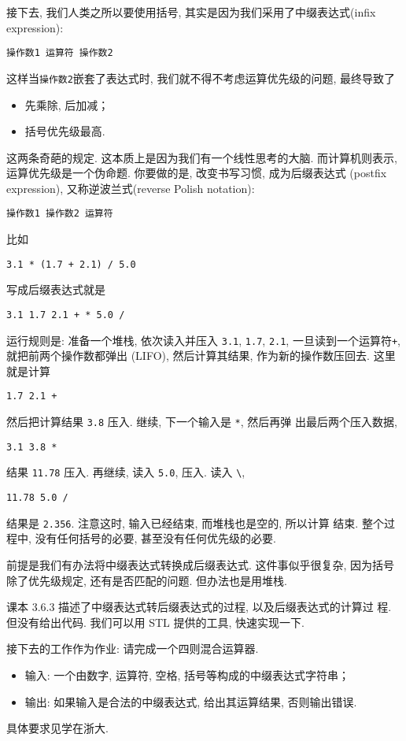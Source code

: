 \documentclass[a4paper]{ctexart}
\theoremstyle{definition}
\theoremstyle{definition}
\begin{document}
接下去, 我们人类之所以要使用括号, 其实是因为我们采用了中缀表达式(inﬁx
expression):
\begin{verbatim}
操作数1 运算符 操作数2 
\end{verbatim}
这样当\verb|操作数2|嵌套了表达式时, 我们就不得不考虑运算优先级的问题,
最终导致了
\begin{itemize}
\item 先乘除, 后加减；
\item 括号优先级最高.
\end{itemize}
这两条奇葩的规定. 这本质上是因为我们有一个线性思考的大脑. 而计算机则表示, 
运算优先级是一个伪命题. 你要做的是, 改变书写习惯, 成为后缀表达式
(postﬁx expression), 又称逆波兰式(reverse Polish notation):
\begin{verbatim}
操作数1 操作数2 运算符  
\end{verbatim}
比如
\begin{verbatim}
3.1 * (1.7 + 2.1) / 5.0
\end{verbatim}
写成后缀表达式就是
\begin{verbatim}
3.1 1.7 2.1 + * 5.0 /
\end{verbatim}
运行规则是: 准备一个堆栈, 依次读入并压入 \verb|3.1|, \verb|1.7|,
\verb|2.1|, 一旦读到一个运算符\verb|+|, 就把前两个操作数都弹出
(LIFO), 然后计算其结果, 作为新的操作数压回去. 这里就是计算
\begin{verbatim}
1.7 2.1 +
\end{verbatim}
然后把计算结果 \verb|3.8| 压入. 继续, 下一个输入是 \verb|*|, 然后再弹
出最后两个压入数据,
\begin{verbatim}
3.1 3.8 *
\end{verbatim}
结果 \verb|11.78| 压入. 再继续, 读入 \verb|5.0|, 压入. 读入 \verb|\|,
\begin{verbatim}
11.78 5.0 /
\end{verbatim}
结果是 \verb|2.356|. 注意这时, 输入已经结束, 而堆栈也是空的, 所以计算
结束. 整个过程中, 没有任何括号的必要, 甚至没有任何优先级的必要.

前提是我们有办法将中缀表达式转换成后缀表达式. 这件事似乎很复杂, 
因为括号除了优先级规定, 还有是否匹配的问题. 但办法也是用堆栈.

课本 3.6.3 描述了中缀表达式转后缀表达式的过程, 以及后缀表达式的计算过
程. 但没有给出代码. 我们可以用 STL 提供的工具, 快速实现一下.

接下去的工作作为作业: 请完成一个四则混合运算器.
\begin{itemize}
\item 输入: 一个由数字, 运算符, 空格, 括号等构成的中缀表达式字符串；
\item 输出: 如果输入是合法的中缀表达式, 给出其运算结果, 否则输出错误.
\end{itemize}
具体要求见学在浙大. 
\end{document}
